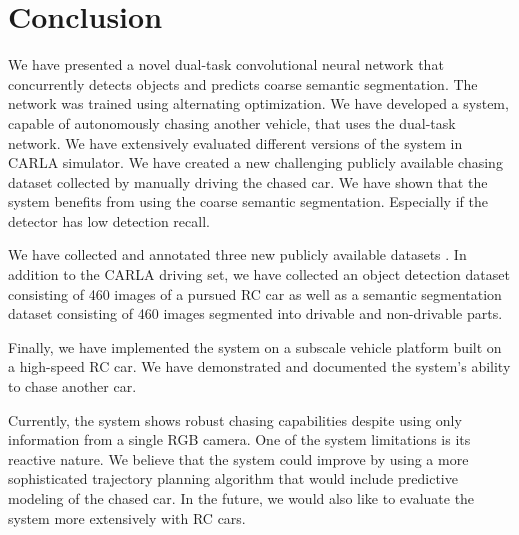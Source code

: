 \documentclass{ctuthesis/ctuthesis}
\begin{document}
\chapter{Conclusion} \label{s:conclusion}
We have presented a novel dual-task convolutional neural network that concurrently detects objects and predicts coarse semantic segmentation. The network was trained using alternating optimization. We have developed a system, capable of autonomously chasing another vehicle, that uses the dual-task network. We have extensively evaluated different versions of the system in CARLA simulator. We have created a new challenging publicly available chasing dataset collected by manually driving the chased car. We have shown that the system benefits from using the coarse semantic segmentation. Especially if the detector has low detection recall.\par
We have collected and annotated three new publicly available datasets \cite{my_github}. In addition to the CARLA driving set, we have collected an object detection dataset consisting of 460 images of a pursued RC car as well as a semantic segmentation dataset consisting of 460 images segmented into drivable and non-drivable parts. \par
Finally, we have implemented the system on a subscale vehicle platform built on a high-speed RC car. We have demonstrated and documented \cite{my_yt_video} the system's ability to chase another car.\par
Currently, the system shows robust chasing capabilities despite using only information from a single RGB camera. One of the system limitations is its reactive nature. We believe that the system could improve by using a more sophisticated trajectory planning algorithm that would include predictive modeling of the chased car. In the future, we would also like to evaluate the system more extensively with RC cars.



\end{document}
